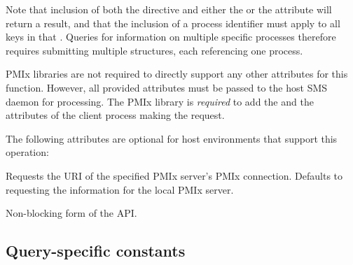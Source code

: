 Note that inclusion of both the  directive and either the  or the  attribute will return a  result, and that the inclusion of a process identifier must apply to all keys in that . Queries for information on multiple specific processes therefore requires submitting multiple  structures, each referencing one process.

\ac{PMIx} libraries are not required to directly support any other attributes for this function. However, all provided attributes must be passed to the host \ac{SMS} daemon for processing. The \ac{PMIx} library is \textit{required} to add the  and the  attributes of the client process making the request.

\reqattrend

\optattrstart
The following attributes are optional for host environments that support this operation:

 Requests the URI of the specified \ac{PMIx} server's \ac{PMIx} connection. Defaults to requesting the information for the local \ac{PMIx} server.
\pasteAttributeItemEnd
{}

\optattrend

\descr

Non-blocking form of the  \ac{API}.


\subsection{Query-specific constants}
\label{api:struct:constants:query}

